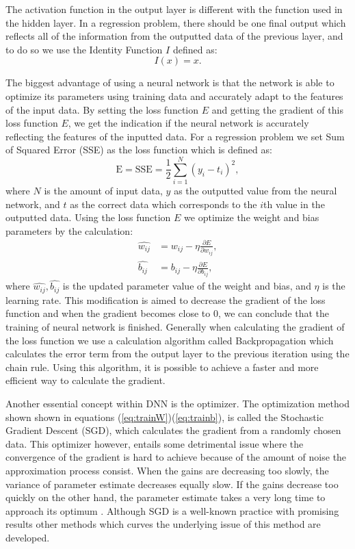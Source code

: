 The activation function in the output layer is different with the function used in the hidden layer. In a regression problem, there should be one final output which reflects all of the information from the outputted data of the previous layer, and to do so we use the Identity Function $I$ defined as:
\begin{equation}
    I(x) = x.
\end{equation}

The biggest advantage of using a neural network is that the network is able to optimize its parameters using training data and accurately adapt to the features of the input data. By setting the loss function $E$ and getting the gradient of this loss function $E$, we get the indication if the neural network is accurately reflecting the features of the inputted data. For a regression problem we set Sum of Squared Error (SSE) as the loss function which is defined as:
\begin{equation}\label{eq:SSE}
    \mathrm{E} = \mathrm{SSE} = \frac{1}{2} \sum_{i=1}^{N}\left(y_{i}-t_{i}\right)^{2},
\end{equation}
where $N$ is the amount of input data, $y$ as the outputted value from the neural network, and $t$ as the correct data which corresponds to the $i$th value in the outputted data. Using the loss function $E$ we optimize the weight and bias parameters by the calculation:
\begin{align}
    \hat{w_{i j}} &= w_{i j} - \eta \frac{\partial E}{\partial w_{i j}},\label{eq:trainW}\\
    \hat{b_{i j}} &= b_{i j} - \eta \frac{\partial E}{\partial b_{i j}}\label{eq:trainb},
\end{align}
where $\hat{w_{i j}}, \hat{b_{i j}}$ is the updated parameter value of the weight and bias, and $\eta$ is the learning rate. This modification is aimed to decrease the gradient of the loss function and when the gradient becomes close to 0, we can conclude that the training of neural network is finished. Generally when calculating the gradient of the loss function we use a calculation algorithm called Backpropagation which calculates the error term from the output layer to the previous iteration using the chain rule. Using this algorithm, it is possible to achieve a faster and more efficient way to calculate the gradient. 

Another essential concept within DNN is the optimizer. The optimization method shown shown in equations (\ref{eq:trainW})(\ref{eq:trainb}), is called the Stochastic Gradient Descent (SGD), which calculates the gradient from a randomly chosen data. This optimizer however, entails some detrimental issue where the convergence of the gradient is hard to achieve because of the amount of noise the approximation process consist. When the gains are decreasing too slowly, the variance of parameter estimate decreases equally slow. If the gains decrease too quickly on the other hand, the parameter estimate takes a very long time to approach its optimum \citep{SGD_problem}. Although SGD is a well-known practice with promising results other methods which curves the underlying issue of this method are developed. 


